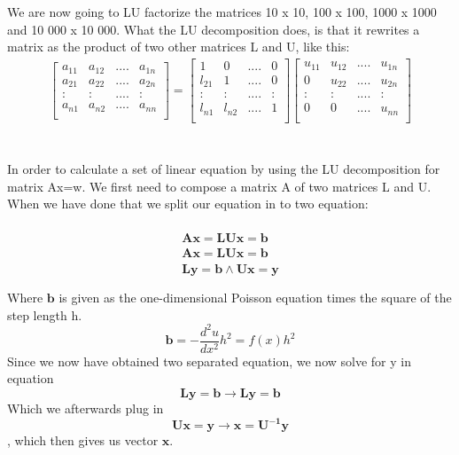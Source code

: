 \documentclass[norsk,a4paper,12pt]{article}
\begin{document}
We are now going to LU factorize the matrices 10 x 10, 100 x 100, 1000 x 1000 and 10 000 x 10 000. What the LU decomposition does, is that it rewrites a matrix as the product of two other matrices L and U, like this:
\begin{align*}
\begin{bmatrix}
a_{11} & a_{12} & .... & a_{1n} \\
a_{21} & a_{22} & .... & a_{2n} \\
: & :& .... & : \\
a_{n1} & a_{n2} & .... & a_{nn} \\
\end{bmatrix}
=
\begin{bmatrix}
1 & 0 & .... & 0 \\
l_{21} & 1 & .... & 0 \\
: & :& .... & : \\
l_{n1} & l_{n2} & .... & 1\\
\end{bmatrix}
\begin{bmatrix}
u_{11} & u_{12} & .... & u_{1n} \\
0 & u_{22} & .... & u_{2n} \\
: & :& .... & : \\
0 & 0& .... & u_{nn} \\
\end{bmatrix}
\end{align*}  
\\
\\
In order to calculate a set of linear equation by using the LU decomposition for matrix Ax=w. We first need to compose a matrix A of two matrices L and U. When we have done that we split our equation in to two equation:
\\
\\
\begin{align*}
\mathbf{A}\mathbf{x}=\mathbf{L}\mathbf{U}\mathbf{x}=\mathbf{b}\\
\mathbf{A}\mathbf{x}=\mathbf{L}\mathbf{U}\mathbf{x}=\mathbf{b}\\
\mathbf{L}\mathbf{y}=\mathbf{b} \land  \mathbf{U}\mathbf{x}=\mathbf{y}\\
\end{align*}
\begin{align*}
\end{align*}
Where $\mathbf{b}$ is given as the one-dimensional Poisson equation times the square of the step length h. $$\mathbf{b}=-\frac{d^2u}{dx^2}h^2=f(x)h^2$$
Since we now have obtained two separated equation, we now solve for y in equation $$\mathbf{L}\mathbf{y}=\mathbf{b} \rightarrow \mathbf{L}\mathbf{y}=\mathbf{b} $$ Which we afterwards plug in  $$\mathbf{U}\mathbf{x}=\mathbf{y} \rightarrow \mathbf{x}=\mathbf{U^{-1}}\mathbf{y}$$, which then gives us vector $\mathbf{x}$.
\end{document}
